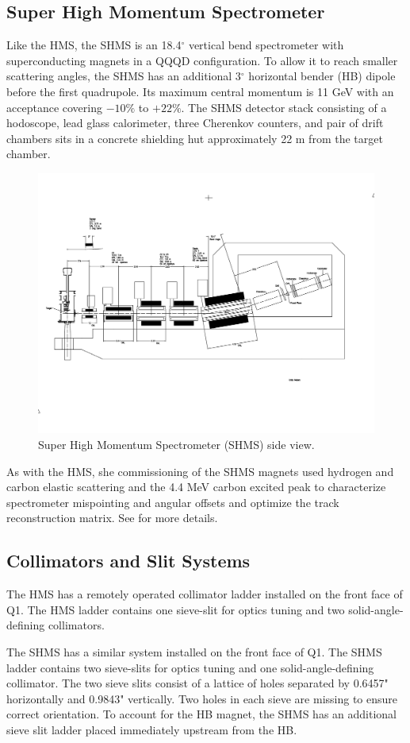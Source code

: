 \subsection{Super High Momentum Spectrometer}
Like the HMS, the SHMS is an 18.4$^{\circ}$ vertical bend spectrometer with
superconducting magnets in a QQQD configuration.
To allow it to reach smaller scattering angles, the SHMS has an additional
3$^{\circ}$ horizontal bender (HB) dipole before the first quadrupole.
Its maximum central momentum is 11 GeV with an acceptance covering $-10\%$
to $+22\%$.
The SHMS detector stack consisting of a hodoscope, lead glass calorimeter,
three Cherenkov counters, and pair of drift chambers sits in a concrete
shielding hut approximately 22 m from the target chamber.

\begin{figure}[!ht]
    \centering
    \includegraphics[width=1.0\textwidth]{chap3/SHMS_Layout_new.pdf}
    \caption{Super High Momentum Spectrometer (SHMS) side view.}
    \label{fig:shms_schematic}
\end{figure}

As with the HMS, she commissioning of the SHMS magnets used hydrogen and carbon
elastic scattering and the 4.4 MeV carbon excited peak to characterize
spectrometer mispointing and angular offsets and optimize the track
reconstruction matrix.
See \cite{Holly_SHMS_Optics} for more details.

\subsection{Collimators and Slit Systems}
The HMS has a remotely operated collimator ladder installed on the front face
of Q1.
The HMS ladder contains one sieve-slit for optics tuning and two
solid-angle-defining collimators.

The SHMS has a similar system installed on the front face of Q1.
The SHMS ladder contains two sieve-slits for optics tuning and one
solid-angle-defining collimator.
The two sieve slits consist of a lattice of holes separated by 0.6457"
horizontally and 0.9843" vertically.
Two holes in each sieve are missing to ensure correct orientation.
To account for the HB magnet, the SHMS has an additional sieve slit ladder
placed immediately upstream from the HB.
